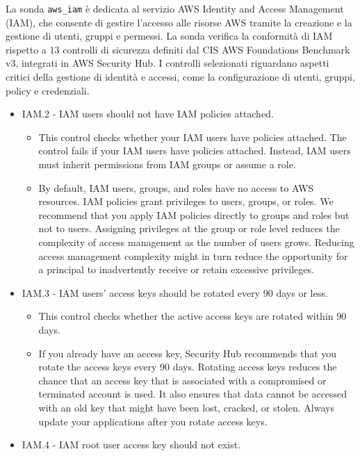 La sonda \texttt{aws\_iam} è dedicata al servizio AWS Identity and Access Management (IAM), che consente di gestire l'accesso alle risorse AWS tramite la creazione e la gestione di utenti, gruppi e permessi. La sonda verifica la conformità di IAM rispetto a 13 controlli di sicurezza definiti dal CIS AWS Foundations Benchmark v3, integrati in AWS Security Hub. I controlli selezionati riguardano aspetti critici della gestione di identità e accessi, come la configurazione di utenti, gruppi, policy e credenziali.
\begin{mdframed}[backgroundcolor=gray!05, linecolor=gray!50]
\itshape
\begin{itemize}
    \item IAM.2 - IAM users should not have IAM policies attached.
    \begin{itemize}
        \item This control checks whether your IAM users have policies attached. The control fails if your IAM users have policies attached. Instead, IAM users must inherit permissions from IAM groups or assume a role.
        \item By default, IAM users, groups, and roles have no access to AWS resources. IAM policies grant privileges to users, groups, or roles. We recommend that you apply IAM policies directly to groups and roles but not to users. Assigning privileges at the group or role level reduces the complexity of access management as the number of users grows. Reducing access management complexity might in turn reduce the opportunity for a principal to inadvertently receive or retain excessive privileges.
    \end{itemize}
    \item IAM.3 - IAM users' access keys should be rotated every 90 days or less.
    \begin{itemize}
        \item This control checks whether the active access keys are rotated within 90 days.
        \item If you already have an access key, Security Hub recommends that you rotate the access keys every 90 days. Rotating access keys reduces the chance that an access key that is associated with a compromised or terminated account is used. It also ensures that data cannot be accessed with an old key that might have been lost, cracked, or stolen. Always update your applications after you rotate access keys.
    \end{itemize}
    \item IAM.4 - IAM root user access key should not exist.

\end{itemize}
\end{mdframed}
